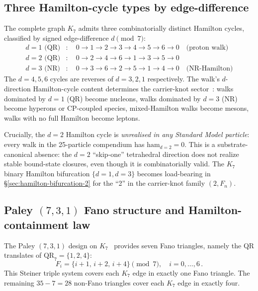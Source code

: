 \documentclass[11pt]{article}
\newcommand{\QR}{\mathrm{QR}}
\begin{document}
\subsection{Three Hamilton-cycle types by edge-difference}
\label{sec:hamilton-types}

The complete graph $K_7$ admits three combinatorially distinct Hamilton cycles, classified by signed edge-difference $d \pmod 7$:
\begin{align}
  d = 1 \text{ (QR)} &: \quad 0 \to 1 \to 2 \to 3 \to 4 \to 5 \to 6 \to 0 \quad \text{(proton walk)} \\
  d = 2 \text{ (QR)} &: \quad 0 \to 2 \to 4 \to 6 \to 1 \to 3 \to 5 \to 0 \\
  d = 3 \text{ (NR)} &: \quad 0 \to 3 \to 6 \to 2 \to 5 \to 1 \to 4 \to 0 \quad \text{(NR-Hamilton)}
\end{align}
The $d = 4, 5, 6$ cycles are reverses of $d = 3, 2, 1$ respectively.  The walk's $d$-direction Hamilton-cycle content determines the carrier-knot sector~\cite{k7-hamilton-cycle-taxonomy}: walks dominated by $d = 1$ (QR) become nucleons, walks dominated by $d = 3$ (NR) become hyperons or CP-coupled species, mixed-Hamilton walks become mesons, walks with no full Hamilton become leptons.

Crucially, the $d = 2$ Hamilton cycle is \emph{unrealised in any Standard Model particle}: every walk in the 25-particle compendium has $\mathrm{ham}_{d=2} = 0$.  This is a substrate-canonical absence: the $d = 2$ ``skip-one'' tetrahedral direction does not realize stable bound-state closures, even though it is combinatorially valid.  The $K_7$ binary Hamilton bifurcation $\{d = 1, d = 3\}$ becomes load-bearing in \S\ref{sec:hamilton-bifurcation-2} for the ``2'' in the carrier-knot family $(2, F_n)$.

\subsection{Paley $(7, 3, 1)$ Fano structure and Hamilton-containment law}
\label{sec:fano-hamilton}

The Paley $(7, 3, 1)$ design on $K_7$~\cite{PaleyHadamard} provides seven Fano triangles, namely the QR translates of $\QR_7 = \{1, 2, 4\}$:
\begin{equation}
  F_i = \{i + 1,\, i + 2,\, i + 4\} \pmod 7, \quad i = 0, \ldots, 6 \, .
\end{equation}
This Steiner triple system covers each $K_7$ edge in exactly one Fano triangle.  The remaining $35 - 7 = 28$ non-Fano triangles cover each $K_7$ edge in exactly four.
\end{document}

